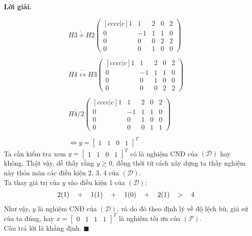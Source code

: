 \documentclass[12pt]{article}
\newenvironment{solution}{%
     \setlength\parindent{0pt}\par\medskip\textbf{Lời giải.}\quad}{%
     \hfill\tiny$\blacksquare$\par\medskip}
\begin{document}
\begin{solution}
\begin{align*}
            \\
            \\
            \underrightarrow{H3 + H2} \begin{pmatrix}[cccc|c]
                1 & 1 & 2 & 0 & 2 \\
                0 & -1 & 1 & 1 & 0 \\
                0 & 0 & 0 & 2 & 2 \\
                0 & 0 & 1 & 0 & 0
            \end{pmatrix}
            \\
            \\
            \underrightarrow{H4 \leftrightarrow H3} \begin{pmatrix}[cccc|c]
                1 & 1 & 2 & 0 & 2 \\
                0 & -1 & 1 & 1 & 0 \\
                0 & 0 & 1 & 0 & 0 \\
                0 & 0 & 0 & 2 & 2
            \end{pmatrix}
            \\
            \\
            \underrightarrow{H4/2} \begin{pmatrix}[cccc|c]
                1 & 1 & 2 & 0 & 2 \\
                0 & -1 & 1 & 1 & 0 \\
                0 & 0 & 1 & 0 & 0 \\
                0 & 0 & 0 & 1 & 1
            \end{pmatrix}
            \\
            \\
            \Leftrightarrow y = \begin{bmatrix} 1 & 1 & 0 & 1 \end{bmatrix}^T
        \end{align*}
        Ta cần kiểm tra xem $y = \begin{bmatrix} 1 & 1 & 0 & 1 \end{bmatrix}^T$ có là nghiệm CNĐ của $(\mathcal{D})$ hay không. Thật vậy, dễ thấy rằng $y \geq 0$, đồng thời từ cách xây dựng ta thấy nghiệm này thỏa mãn các điều kiện 2, 3, 4 của $(\mathcal{D})$.
        \\
        Ta thay giá trị của $y$ vào điều kiện 1 của $(\mathcal{D})$:
        \begin{align*}
            \begin{tabular}{ccccccccc}
                $2(1)$ & $+$ & $1(1)$ & $+$ & $1(0)$ & $+$ & $2(1)$ & $>$ & 4
            \end{tabular}
        \end{align*}
        Như vậy, $y$ là nghiệm CNĐ của $(\mathcal{D})$, và do đó theo định lý về độ lệch bù, giả sử của ta đúng, hay $x = \begin{bmatrix} 0 & 1 & 1 & 1 \end{bmatrix}^T$ là nghiệm tối ưu của $(\mathcal{P})$.
        \\
        Câu trả lời là khẳng định.
    \end{solution}
\end{document}
